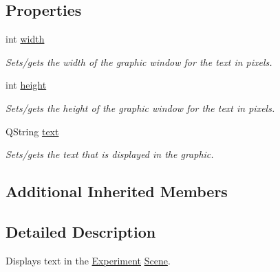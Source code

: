 \subsection*{Properties}
\begin{DoxyCompactItemize}
\item 
\hypertarget{class_picto_1_1_text_graphic_a4ca721bd63e87537ce61b2c30a8593cc}{int \hyperlink{class_picto_1_1_text_graphic_a4ca721bd63e87537ce61b2c30a8593cc}{width}}\label{class_picto_1_1_text_graphic_a4ca721bd63e87537ce61b2c30a8593cc}

\begin{DoxyCompactList}\small\item\em Sets/gets the width of the graphic window for the text in pixels. \end{DoxyCompactList}\item 
\hypertarget{class_picto_1_1_text_graphic_a573a98a656cca4260f5304929a4df0fe}{int \hyperlink{class_picto_1_1_text_graphic_a573a98a656cca4260f5304929a4df0fe}{height}}\label{class_picto_1_1_text_graphic_a573a98a656cca4260f5304929a4df0fe}

\begin{DoxyCompactList}\small\item\em Sets/gets the height of the graphic window for the text in pixels. \end{DoxyCompactList}\item 
\hypertarget{class_picto_1_1_text_graphic_adccc3ff15e9b3adf58ad589935786bd2}{Q\-String \hyperlink{class_picto_1_1_text_graphic_adccc3ff15e9b3adf58ad589935786bd2}{text}}\label{class_picto_1_1_text_graphic_adccc3ff15e9b3adf58ad589935786bd2}

\begin{DoxyCompactList}\small\item\em Sets/gets the text that is displayed in the graphic. \end{DoxyCompactList}\end{DoxyCompactItemize}
\subsection*{Additional Inherited Members}


\subsection{Detailed Description}
Displays text in the \hyperlink{class_picto_1_1_experiment}{Experiment} \hyperlink{class_picto_1_1_scene}{Scene}. 

